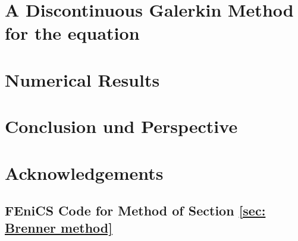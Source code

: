 \documentclass{template}
\begin{document}
\chapter{A Discontinuous Galerkin Method for the \MA equation}
\label{ch:ourMethod}


\chapter{Numerical Results}
\label{ch:NumericalResults}



\chapter{Conclusion und Perspective}
\label{ch:conclusion}


\chapter*{Acknowledgements}

\begin{appendices}



	\chapter{FEniCS Code for Method of Section \ref{sec: Brenner method}}
%	
	
\end{appendices}



\newpage
%
\newpage


\end{document}
